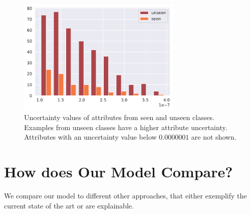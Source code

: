 \documentclass[a4paper,cleardoubleempty,BCOR1cm, 11pt]{report}
\begin{document}
\begin{figure}[t!]
	\centering
	\includegraphics[width=0.7\textwidth]{images/zero_shot_class_uncertainty_median_hist.pdf}
	\caption{Uncertainty values of attributes from seen and unseen classes. Examples from unseen classes have a higher attribute uncertainty. Attributes with an uncertainty value below $0.0000001$ are not shown.}
	\label{fig:zero_shot_uncert}
\end{figure}


\section{How does Our Model Compare?}\label{sec:results}
We compare our model to different other approaches, that either exemplify the current state of the art or are explainable.
\end{document}
